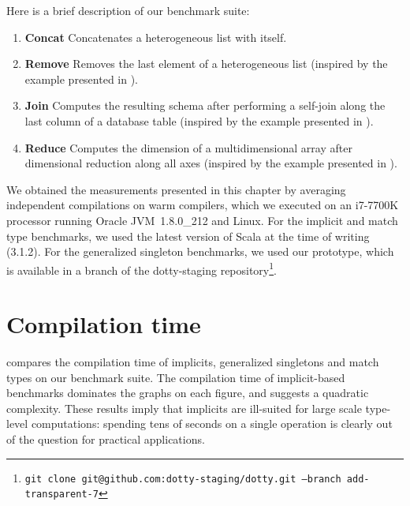 Here is a brief description of our benchmark suite:

\begin{enumerate}
  \item \textbf{Concat}\quad
  Concatenates a heterogeneous list with itself.

  \item \textbf{Remove}\quad
  Removes the last element of a heterogeneous list (inspired by the example presented in ).

  \item \textbf{Join}\quad
  Computes the resulting schema after performing a self-join along the last column of a database table (inspired by the example presented in ).

  \item \textbf{Reduce}\quad
  Computes the dimension of a multidimensional array after dimensional reduction along all axes (inspired by the example presented in ).
\end{enumerate}

We obtained the measurements presented in this chapter by averaging independent compilations on warm compilers, which we executed on an i7-7700K processor running Oracle JVM~1.8.0\_212 and Linux.
For the implicit and match type benchmarks, we used the latest version of Scala at the time of writing (3.1.2).
For the generalized singleton benchmarks, we used our prototype, which is available in a branch of the dotty-staging repository\footnote{\texttt{git clone git@github.com:dotty-staging/dotty.git --branch add-transparent-7}}.

\section{Compilation time}
\label{sec:compilation-time}


 compares the compilation time of implicits, generalized singletons and match types on our benchmark suite.
The compilation time of implicit-based benchmarks dominates the graphs on each figure, and suggests a quadratic complexity.
These results imply that implicits are ill-suited for large scale type-level computations: spending tens of seconds on a single operation is clearly out of the question for practical applications.

